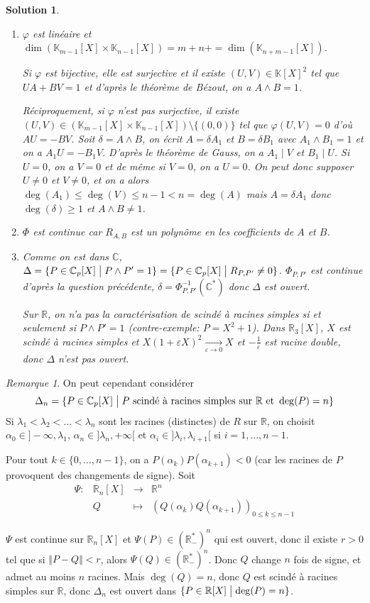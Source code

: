 \documentclass[12pt]{article}
\newtheorem{solution}{Solution}[section]
\theoremstyle{remark}
\newtheorem{remark}{Remarque}[section]
\newcommand{\K}{\mathbb{K}} \newcommand{\R}{\mathbb{R}}
\newcommand{\C}{\mathbb{C}} \newcommand{\Q}{\mathbb{Q}}
\newcommand{\function}[5]{
	$$
	\begin{array}{rccl}
		#1: & #2 & \to & #3 \\
		& #4 & \mapsto & #5
	\end{array}
	$$
}
\begin{document}
\begin{solution}
	\phantom{}
	\begin{enumerate}
		\item $\varphi$ est linéaire et $\dim(\K_{m-1}[X]\times\K_{n-1}[X])=m+n+=\dim(\K_{n+m-1}[X])$.
		
		Si $\varphi$ est bijective, elle est surjective et il existe $(U,V)\in\K[X]^{2}$ tel que $UA+BV=1$ et d'après le théorème de Bézout, on a $A\wedge B=1$.

		Réciproquement, si $\varphi$ n'est pas surjective, il existe $(U,V)\in(\K_{m-1}[X]\times\K_{n-1}[X])\setminus\{(0,0)\}$ tel que $\varphi(U,V)=0$ d'où $AU=-BV$. Soit $\delta=A\wedge B$, on écrit $A=\delta A_{1}$ et $B=\delta B_{1}$ avec $A_{1}\wedge B_{1}=1$ et on a $A_{1}U=-B_{1}V$. D'après le théorème de Gauss, on a $A_{1}\mid V$ et $B_{1}\mid U$. Si $U=0$, on a $V=0$ et de même si $V=0$, on a $U=0$. On peut donc supposer $U\neq0$ et $V\neq 0$, et on a alors $\deg(A_{1})\leqslant\deg(V)\leqslant n-1<n=\deg(A)$ mais $A=\delta A_{1}$ donc $\deg(\delta)\geqslant1$ et $A\wedge B\neq 1$.

		\item $\Phi$ est continue car $R_{A,B}$ est un polynôme en les coefficients de $A$ et $B$.
		
		\item Comme on est dans $\C$, $\Delta=\{P\in\C_{p}[X]\bigm| P\wedge P'=1\}=\{P\in\C_p[X]\bigm| R_{P,P'}\neq0\}$. $\Phi_{P,P'}$ est continue d'après la question précédente, $\delta=\Phi_{P,P'}^{-1}(\C^{*})$ donc $\Delta$ est ouvert.
		
		Sur $\R$, on n'a pas la caractérisation de scindé à racines simples si et seulement si $P\wedge P'=1$ (contre-exemple: $P=X^{2}+1$). Dans $\R_{3}[X]$, $X$ est scindé à racines simples et $X(1+\varepsilon X)^{2}\xrightarrow[\varepsilon\to0]{}X$ et $-\frac{1}{\varepsilon}$ est racine double, donc $\Delta$ n'est pas ouvert.
	\end{enumerate}
\end{solution}

\begin{remark}
	On peut cependant considérer 
	$$\Delta_{n}=\{P\in\C_{p}[X]\bigm| P\text{ scindé à racines simples sur }\R\text{ et }\deg(P)=n\}$$
	Si $\lambda_{1}<\lambda_{2}<\dots<\lambda_{n}$ sont les racines (distinctes) de $R$ sur $\R$, on choisit $\alpha_{0}\in]-\infty,\lambda_{1}$, $\alpha_{n}\in]\lambda_{n},+\infty[$ et $\alpha_{i}\in]\lambda_{i},\lambda_{i+1}[$ si $i=1,\dots,n-1$. 

	Pour tout $k\in\{0,\dots,n-1\}$, on a $P(\alpha_{k})P(\alpha_{k+1})<0$ (car les racines de $P$ provoquent des changements de signe). Soit \function{\Psi}{\R_n[X]}{\R^n}{Q}{(Q(\alpha_{k})Q(\alpha_{k+1}))_{0\leqslant k\leqslant n-1}}
	$\Psi$ est continue sur $\R_{n}[X]$ et $\Psi(P)\in(\R_{-}^{*})^{n}$ qui est ouvert, donc il existe $r>0$ tel que si $\Vert P-Q\Vert<r$, alors $\Psi(Q)\in(\R_{-}^{*})^{n}$. Donc $Q$ change $n$ fois de signe, et admet au moins $n$ racines. Mais $\deg(Q)=n$, donc $Q$ est scindé à racines simples sur $\R$, donc $\Delta_{n}$ est ouvert dans $\{P\in\R[X]\bigm|\deg(P)=n\}$.
\end{remark}
\end{document}
